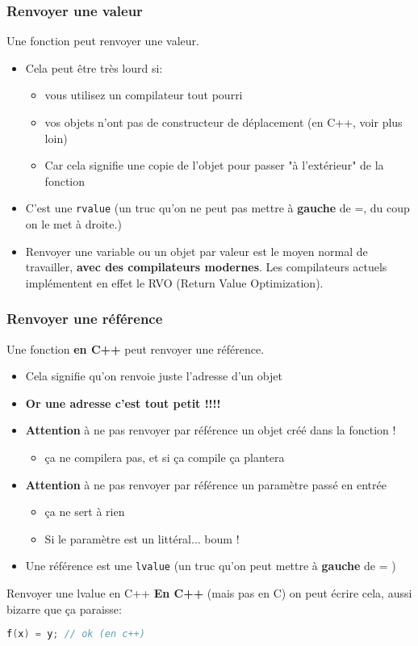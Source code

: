 \documentclass{beamer}
\begin{document}
\begin{frame}[fragile=singleslide,shrink=20]
\frametitle{Renvoyer une valeur}
Une fonction peut renvoyer une valeur.
\begin{itemize}
\item{Cela peut être très lourd si:
\begin{itemize}
\item{vous utilisez un compilateur tout pourri}
\item{vos objets n'ont pas de constructeur de déplacement (en C++, voir plus loin)}
\item{Car cela signifie une copie de l'objet pour passer "à l'extérieur" de la fonction}
\end{itemize}}
\item{C'est une \texttt{rvalue} (un truc qu'on ne peut pas mettre à \textbf{gauche} de =, du coup on le met à droite.) }
\item Renvoyer une variable ou un objet par valeur est le moyen normal de travailler, \textbf{avec des compilateurs modernes}. Les
compilateurs actuels implémentent en effet le RVO (Return Value Optimization).
\end{itemize}

\end{frame}

\begin{frame}[fragile=singleslide,shrink=20]
\frametitle{Renvoyer une référence}
Une fonction \textbf{en C++} peut renvoyer une référence.
\begin{itemize}
\item{Cela signifie qu'on renvoie juste l'adresse d'un objet}
\item{\textbf{Or une adresse c'est tout petit !!!!}}
\item{\textbf{Attention} à ne pas renvoyer par référence un objet créé dans la fonction !}
\begin{itemize}
\item{ça ne compilera pas, et si ça compile ça plantera}
\end{itemize}
\item{\textbf{Attention} à ne pas renvoyer par référence un paramètre passé en entrée}
\begin{itemize}
\item{ça ne sert à rien}
\item{Si le paramètre est un littéral... boum !}
\end{itemize}
\item Une référence est une \texttt{lvalue} (un truc qu'on peut mettre à \textbf{gauche} de = )
\end{itemize}

\begin{block}{Renvoyer une lvalue en C++}
\textbf{En C++} (mais pas en C) on peut écrire cela, aussi bizarre que ça paraisse:
\begin{lstlisting}[language=c++]
f(x) = y; // ok (en c++)
\end{lstlisting}
\end{block}
\end{frame}
\end{document}
